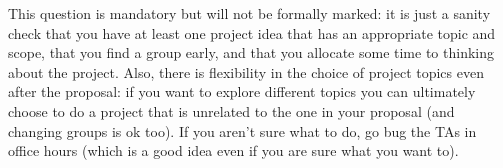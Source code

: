 \documentclass{article}
\def\blu#1{{\color{blu}#1}}
\begin{document}
\blu{This question is mandatory but will not be formally marked: it is just a sanity check that you have at least one project idea that has an appropriate topic and scope, that you find a group early, and that you  allocate some time to thinking about the project.}
Also, there is flexibility in the choice of project topics even after the proposal: if you want to explore different topics you can ultimately choose to do a project that is unrelated to the one in your proposal (and changing groups is ok too). If you aren't sure what to do, go bug the TAs in office hours (which is a good idea even if you are sure what you want to).
\end{document}
